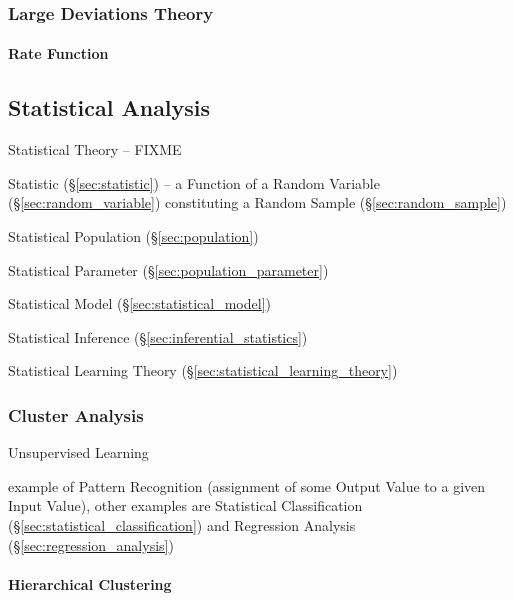 \subsubsection{Large Deviations Theory}\label{sec:large_deviations_theory}

\paragraph{Rate Function}\label{sec:rate_function}\hfill



\subsection{Statistical Analysis}\label{sec:statistical_analysis}


Statistical Theory -- FIXME

Statistic (\S\ref{sec:statistic}) -- a Function of a Random Variable
(\S\ref{sec:random_variable}) constituting a Random Sample
(\S\ref{sec:random_sample})

Statistical Population (\S\ref{sec:population})

Statistical Parameter (\S\ref{sec:population_parameter})

Statistical Model (\S\ref{sec:statistical_model})

Statistical Inference (\S\ref{sec:inferential_statistics})

Statistical Learning Theory (\S\ref{sec:statistical_learning_theory})



\subsubsection{Cluster Analysis}\label{sec:cluster_analysis}

Unsupervised Learning

example of Pattern Recognition (assignment of some Output Value to a given Input
Value), other examples are Statistical Classification
(\S\ref{sec:statistical_classification}) and Regression Analysis
(\S\ref{sec:regression_analysis})



\paragraph{Hierarchical Clustering}\label{sec:hierarchical_clustering}\hfill



